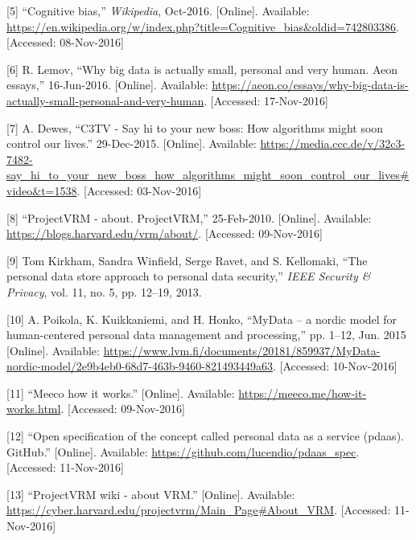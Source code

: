\documentclass[12pt,english,a4paper,titlepage,cleardoublepage=empty,dottedtoc]{report}
\begin{document}
\hypertarget{ref-wikipedia_2016_cognitive-bias}{}
{[}5{]} ``Cognitive bias,'' \emph{Wikipedia}, Oct-2016. {[}Online{]}.
Available:
\url{https://en.wikipedia.org/w/index.php?title=Cognitive_bias\&oldid=742803386}.
{[}Accessed: 08-Nov-2016{]}

\hypertarget{ref-web_2016_big-data-is-people}{}
{[}6{]} R. Lemov, ``Why big data is actually small, personal and very
human. Aeon essays,'' 16-Jun-2016. {[}Online{]}. Available:
\url{https://aeon.co/essays/why-big-data-is-actually-small-personal-and-very-human}.
{[}Accessed: 17-Nov-2016{]}

\hypertarget{ref-video_2015_big-data-and-deep-learning_discrimination}{}
{[}7{]} A. Dewes, ``C3TV - Say hi to your new boss: How algorithms might
soon control our lives.'' 29-Dec-2015. {[}Online{]}. Available:
\url{https://media.ccc.de/v/32c3-7482-say_hi_to_your_new_boss_how_algorithms_might_soon_control_our_lives\#video\&t=1538}.
{[}Accessed: 03-Nov-2016{]}

\hypertarget{ref-web_2010_projectvrm_about}{}
{[}8{]} ``ProjectVRM - about. ProjectVRM,'' 25-Feb-2010. {[}Online{]}.
Available: \url{https://blogs.harvard.edu/vrm/about/}. {[}Accessed:
09-Nov-2016{]}

\hypertarget{ref-paper_2013_the-personal-data-store-approach-to-personal-data-security_2013}{}
{[}9{]} Tom Kirkham, Sandra Winfield, Serge Ravet, and S. Kellomaki,
``The personal data store approach to personal data security,''
\emph{IEEE Security \& Privacy}, vol. 11, no. 5, pp. 12--19, 2013.

\hypertarget{ref-whitepaper_2014_mydata-a-nordic-model-for-human-centered-personal-data-management-and-processing}{}
{[}10{]} A. Poikola, K. Kuikkaniemi, and H. Honko, ``MyData -- a nordic
model for human-centered personal data management and processing,'' pp.
1--12, Jun. 2015 {[}Online{]}. Available:
\url{https://www.lvm.fi/documents/20181/859937/MyData-nordic-model/2e9b4eb0-68d7-463b-9460-821493449a63}.
{[}Accessed: 10-Nov-2016{]}

\hypertarget{ref-web_2016_meeco-how-it-works}{}
{[}11{]} ``Meeco how it works.'' {[}Online{]}. Available:
\url{https://meeco.me/how-it-works.html}. {[}Accessed: 09-Nov-2016{]}

\hypertarget{ref-repo_2016_pdaas-spec}{}
{[}12{]} ``Open specification of the concept called personal data as a
service (pdaas). GitHub.'' {[}Online{]}. Available:
\url{https://github.com/lucendio/pdaas_spec}. {[}Accessed:
11-Nov-2016{]}

\hypertarget{ref-web_2010_projectvrm-wiki_about-vrm}{}
{[}13{]} ``ProjectVRM wiki - about VRM.'' {[}Online{]}. Available:
\url{https://cyber.harvard.edu/projectvrm/Main_Page\#About_VRM}.
{[}Accessed: 11-Nov-2016{]}
\end{document}
